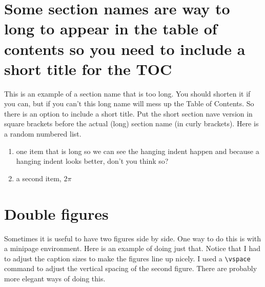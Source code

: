 \section[Long Section Names]{Some section names are way to long to appear in the table of contents so you need to include a short title for the TOC}
This is an example of a section name that is too long.  You should shorten it if you can, but if you can't this long name will mess up the Table of Contents.  So there is an option to include a short title.  Put the short section nave version in square brackets before the actual (long) section name (in curly brackets).
Here is a random numbered list.
\begin{enumerate}
	\item one item that is long so we can see the hanging indent happen and because a hanging indent looks better, don't you think so?
	\item a second item, $2 \pi$
	
\end{enumerate}

\section{Double figures}
Sometimes it is useful to have two figures side by side. One way to do this is with a minipage environment. Here is an example of doing just that. Notice that I had to adjust the caption sizes to make the figures line up nicely. I used a \verb|\vspace| command to adjust the vertical spacing of the second figure. There are probably more elegant ways of doing this.

